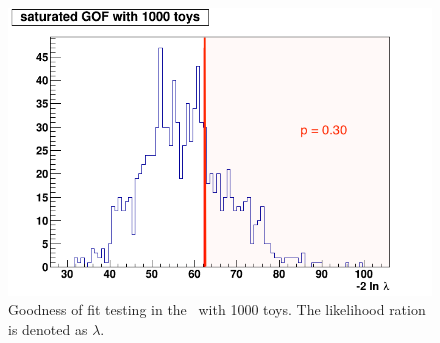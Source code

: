 \begin{figure}[htbp]
	\centering
	 \includegraphics[width=0.7\linewidth]{6_Search/Figures/GOF/GOF_1000toys}
	\caption{Goodness of fit testing in the \WZCR\  with 1000 toys. The likelihood ration is denoted as $\lambda$.}
	\label{fig:gof}
\end{figure}

